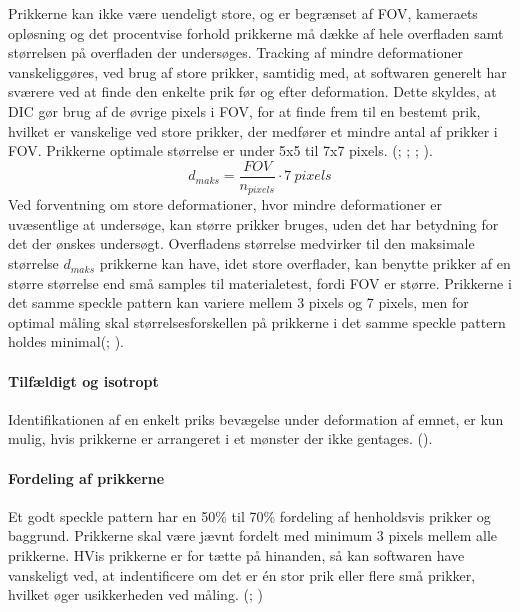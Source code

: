 Prikkerne kan ikke være uendeligt store, og er begrænset af FOV, kameraets opløsning og det procentvise forhold prikkerne må dække af hele overfladen samt størrelsen på overfladen der undersøges. Tracking af mindre deformationer vanskeliggøres, ved brug af store prikker, samtidig med, at softwaren generelt har sværere ved at finde den enkelte prik før og efter  deformation. Dette skyldes, at DIC gør brug af de øvrige pixels i FOV, for at finde frem til en bestemt prik, hvilket er vanskelige ved store prikker, der medfører et mindre antal af prikker i FOV. Prikkerne optimale størrelse er under 5x5 til 7x7 pixels. (\cite{Haddadi2008UseTechnique}; \cite{Crammond2013SpeckleCorrelation}; \cite{Dong2017ACorrelation}; \cite{Gagnon2024ThePatterns}).
 \begin{equation} \label{equ:prikstørrelse-d_max}
     d_{maks} = \frac{FOV}{n_{pixels}} \cdot 7 \ pixels
 \end{equation}
Ved forventning om store deformationer, hvor mindre deformationer er uvæsentlige at undersøge, kan større prikker bruges, uden det har betydning for det der ønskes undersøgt. Overfladens størrelse  medvirker til den maksimale størrelse $d_{maks}$ prikkerne kan have, idet store overflader, kan benytte prikker af en større størrelse end små samples til materialetest, fordi FOV er større. Prikkerne i det samme speckle pattern kan variere mellem 3 pixels og 7 pixels, men for optimal måling skal størrelsesforskellen på prikkerne i det samme speckle pattern holdes minimal(\cite{Crammond2013SpeckleCorrelation}; \cite{Gagnon2024ThePatterns}).  

\paragraph{Tilfældigt og isotropt} Identifikationen af en enkelt priks bevægelse under deformation af emnet, er kun mulig, hvis prikkerne er arrangeret i et mønster der ikke gentages.  (\cite{Zaya2023ApplicationReview}).

\paragraph{Fordeling af prikkerne} Et godt speckle pattern har en 50\% til 70\% fordeling af henholdsvis prikker og baggrund. Prikkerne skal være jævnt fordelt med minimum 3 pixels mellem alle prikkerne. HVis prikkerne er for tætte på hinanden, så kan softwaren have vanskeligt ved, at indentificere om det er én stor prik eller flere små prikker, hvilket øger usikkerheden ved måling. (\cite{Reu2015AllDensity}; \cite{Caliskan2024InvestigationDIC})

